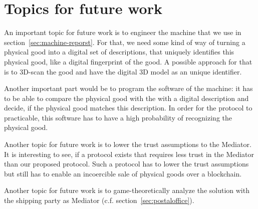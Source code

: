 \documentclass{cacthesis}
\begin{document}


\section{Topics for future work}

An important topic for future work is to engineer the machine that we use in section~\ref{sec:machine-reporst}. For that, we need some kind of way of turning a physical good into a digital set of descriptions, that uniquely identifies this physical good, like a digital fingerprint of the good. A possible approach for that is to 3D-scan the good and have the digital 3D model as an unique identifier.\newline

Another important part would be to program the software of the machine: it has to be able to compare the physical good with the with a digital description and decide, if the physical good matches this description. In order for the protocol to practicable, this software has to have a high probability of recognizing the physical good.\newline

Another topic for future work is to lower the trust assumptions to the Mediator. It is interesting to see, if a protocol exists that requires less trust in the Mediator than our proposed protocol. Such a protocol has to lower the trust assumptions but still has to enable an incoercible sale of physical goods over a blockchain.\newline

Another topic for future work is to game-theoretically analyze the solution with the shipping party as Mediator (c.f. section~\ref{sec:postaloffice}). 




	
	
	\printbibliography
	
	\appendix
\end{document}
